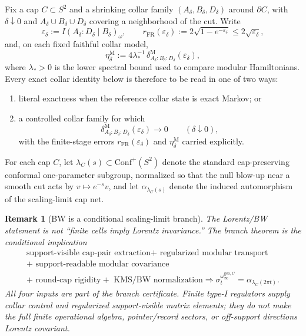 \documentclass[11pt]{article}
\newtheorem{remark}[theorem]{Remark}
\newcommand{\Conf}{\mathrm{Conf}}
\begin{document}
Fix a cap \(C\subset S^2\) and a shrinking collar family \((A_\delta,B_\delta,D_\delta)\) around \(\partial C\), with \(\delta\downarrow 0\) and \(A_\delta\cup B_\delta\cup D_\delta\) covering a neighborhood of the cut. Write
\[
\varepsilon_\delta:=I(A_\delta:D_\delta\mid B_\delta)_\omega,
\qquad
r_{\mathrm{FR}}(\varepsilon_\delta):=
2\sqrt{1-e^{-\varepsilon_\delta}}
\le 2\sqrt{\varepsilon_\delta},
\]
and, on each fixed faithful collar model,
\[
\eta_\delta^{\mathrm M}
:=
4\lambda_\ast^{-1}\,
\delta^{\mathrm M}_{A_\delta:B_\delta:D_\delta}(\varepsilon_\delta),
\]
where \(\lambda_\ast>0\) is the lower spectral bound used to compare modular Hamiltonians. Every exact collar identity below is therefore to be read in one of two ways:
\begin{enumerate}[leftmargin=2em]
\item literal exactness when the reference collar state is exact Markov; or
\item a controlled collar family for which
\[
\delta^{\mathrm M}_{A_\delta:B_\delta:D_\delta}(\varepsilon_\delta)\to 0
\qquad(\delta\downarrow 0),
\]
with the finite-stage errors \(r_{\mathrm{FR}}(\varepsilon_\delta)\) and \(\eta_\delta^{\mathrm M}\) carried explicitly.
\end{enumerate}

For each cap \(C\), let \(\lambda_C(s)\subset \Conf^+(S^2)\) denote the standard cap-preserving conformal one-parameter subgroup, normalized so that the null blow-up near a smooth cut acts by \(v\mapsto e^{-s}v\), and let \(\alpha_{\lambda_C(s)}\) denote the induced automorphism of the scaling-limit cap net.

\begin{remark}[BW is a conditional scaling-limit branch]\label{rem:bw-conditional-branch}
The Lorentz/BW statement is not ``finite cells imply Lorentz invariance.''  The branch theorem is
the conditional implication
\[
\begin{gathered}
\text{support-visible cap-pair extraction}
+\text{ regularized modular transport}\\
+\text{ support-readable modular covariance}\\
+\text{ round-cap rigidity}
+\text{ KMS/BW normalization}
\Longrightarrow
\sigma_t^{\omega_\infty^{\mathrm{geo},C}}
=
\alpha_{\lambda_C(2\pi t)} .
\end{gathered}
\]
All four inputs are part of the branch certificate. Finite type-I regulators supply collar
control and regularized support-visible matrix elements; they do not make the full finite
operational algebra, pointer/record sectors, or off-support directions Lorentz covariant.
\end{remark}
\end{document}
